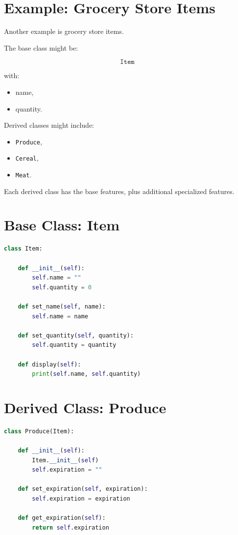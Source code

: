 \documentclass[11pt]{article}
\begin{document}
\section{Example: Grocery Store Items}

Another example is grocery store items.

The base class might be:

\[
\texttt{Item}
\]

with:

\begin{itemize}
    \item name,
    \item quantity.
\end{itemize}

Derived classes might include:

\begin{itemize}
    \item \texttt{Produce},
    \item \texttt{Cereal},
    \item \texttt{Meat}.
\end{itemize}

Each derived class has the base features, plus additional specialized features.

\section{Base Class: Item}

\begin{lstlisting}[language=Python]
class Item:

    def __init__(self):
        self.name = ""
        self.quantity = 0

    def set_name(self, name):
        self.name = name

    def set_quantity(self, quantity):
        self.quantity = quantity

    def display(self):
        print(self.name, self.quantity)
\end{lstlisting}

\section{Derived Class: Produce}

\begin{lstlisting}[language=Python]
class Produce(Item):

    def __init__(self):
        Item.__init__(self)
        self.expiration = ""

    def set_expiration(self, expiration):
        self.expiration = expiration

    def get_expiration(self):
        return self.expiration
\end{lstlisting}
\end{document}
